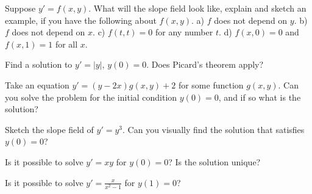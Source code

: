 \documentclass[12pt]{book}
\begin{document}
\begin{exercise}
Suppose $y' = f(x,y)$.  What will the slope field look like, explain and
sketch an example, if you have the following about $f(x,y)$.  a) $f$ does
not depend on $y$.  b) $f$ does not depend on $x$.  c) $f(t,t) = 0$ for any
number $t$.  d) $f(x,0) = 0$ and $f(x,1) = 1$ for all $x$.
\end{exercise}

\begin{exercise}
Find a solution to $y' = \lvert y \rvert$, $y(0) = 0$.  Does Picard's theorem apply?
\end{exercise}

\begin{exercise}
Take an equation $y' = (y-2x) g(x,y) + 2$ for some function $g(x,y)$.
Can you solve the problem for the
initial condition $y(0) = 0$,
and if so what is the solution?
\end{exercise}

\setcounter{exercise}{100}

\begin{exercise}
Sketch the slope field of $y'=y^3$.  Can you visually find the solution
that satisfies $y(0)=0$?
\end{exercise}

\begin{exercise}
Is it possible to solve $y' = xy$ for $y(0) = 0$?  Is the solution unique?
\end{exercise}

\begin{exercise}
Is it possible to solve $y' = \frac{x}{x^2-1}$ for $y(1) = 0$?
\end{exercise}
\end{document}

